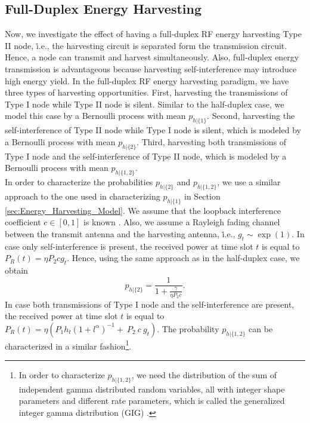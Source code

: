 \documentclass[draftcls,12pt,onecolumn]{IEEEtran}
\begin{document}
\subsection{Full-Duplex Energy Harvesting}
Now, we investigate the effect of having a full-duplex RF energy harvesting Type II node, \.i.e., the harvesting circuit is separated form the transmission circuit. Hence, a node can transmit and harvest simultaneously. Also, full-duplex energy transmission is advantageous because harvesting self-interference may introduce high energy yield. In the full-duplex RF energy harvesting paradigm, we have three types of harvesting opportunities. First, harvesting the transmissions of Type I node while Type II node is silent. Similar to the half-duplex case, we model this case by a Bernoulli process with mean $p_{h|\lbrace 1 \rbrace}$. Second, harvesting the self-interference of Type II node while Type I node is silent, which is modeled by a Bernoulli process with mean $p_{h|\lbrace 2 \rbrace}$. Third,  harvesting both transmissions of Type I node and the self-interference of Type II node, which is modeled by a Bernoulli process with mean $p_{h|\lbrace1, 2 \rbrace}$.\\
\indent In order to characterize the probabilities $p_{h|\lbrace 2 \rbrace}$ and $p_{h|\lbrace1, 2 \rbrace}$, we use a similar approach to the one used in characterizing $p_{h|\lbrace 1 \rbrace}$ in Section \ref{sec:Energy_Harvesting_Model}. We assume that the loopback interference coefficient $c \in [0,1]$ is known \cite{thangaraj2012self}. Also, we assume a Rayleigh fading channel between the transmit antenna and the harvesting antenna, \.i.e., $g_t \sim \exp(1)$. In case only self-interference is present, the received power at time slot $t$ is equal to $P_{R}(t)= \eta  P_2  c g_t$. Hence, using the same approach as in the half-duplex case, we obtain
\begin{equation}
p_{h|\lbrace 2 \rbrace}= \frac{1}{1+ \frac{\gamma}{\eta P_2 c}}.
\end{equation}
In case both transmissions of Type I node and the self-interference are present, the received power at time slot $t$ is equal to $ P_{R}(t)=\eta (P_1 h_t (1+l^\alpha)^{-1} +  \ P_2 \ c \ g_t )$. The probability $p_{h|\lbrace1, 2 \rbrace}$ can be characterized in a similar fashion\footnote{In order to characterize $p_{h|\lbrace1, 2 \rbrace}$, we need the distribution of the sum of independent gamma distributed random variables, all with integer shape parameters and different rate parameters, which is called the generalized integer gamma distribution (GIG) \cite{coelho1998generalized}.}.\\
\end{document}
